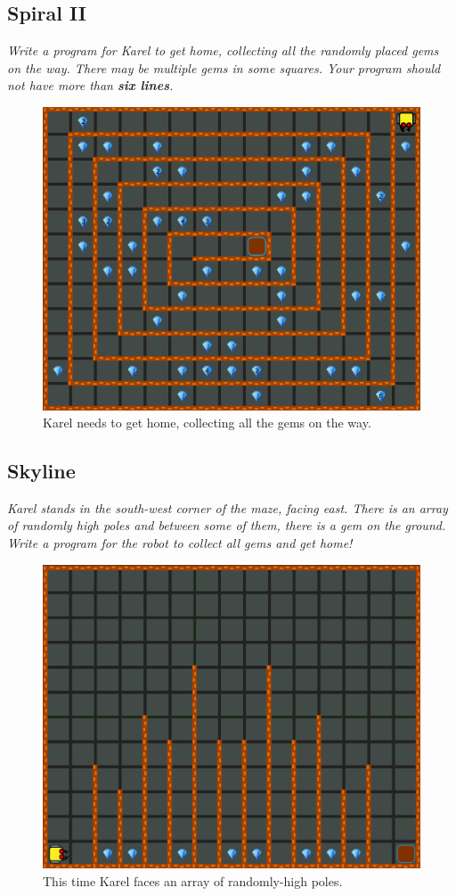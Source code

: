 {{\subsection{Spiral II}

{\em Write a program for Karel to get home, collecting all the randomly placed 
gems on the way. There may be multiple gems in some squares. 
Your program should not have more than {\bf six lines}.}

\begin{figure}[!ht]
\begin{center}
\includegraphics[height=0.4\textwidth]{img/e05.png}
\end{center}
\vspace{-4mm}
\caption{Karel needs to get home, collecting all the gems on the way.}
\label{fig:e05}
\end{figure}



\subsection{Skyline}

{\em Karel stands in the south-west corner of the maze, facing east. There 
is an array of randomly high poles and between some of them, there is a gem
on the ground. Write a program for the robot to collect all gems and get 
home!}

\newpage

\begin{figure}[!ht]
\begin{center}
\includegraphics[height=0.4\textwidth]{img/e06.png}
\end{center}
\vspace{-4mm}
\caption{This time Karel faces an array of randomly-high poles.}
\label{fig:e06}
\end{figure}

}}

